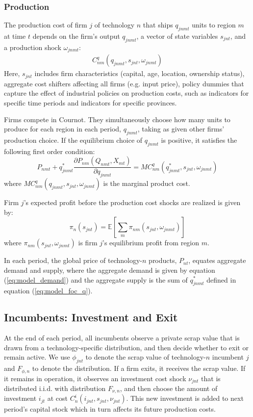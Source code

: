 \documentclass[12pt]{article}
\begin{document}
\subsubsection*{Production}
The production cost of firm $j$ of technology $n$ that ships $q_{jnmt}$ units to region $m$ at time $t$ depends on the firm's output $q_{jnmt}$, a vector of state variables $s_{jnt}$, and a production shock $\omega_{jnmt}$:
    \begin{align}
         C^q_{nm}(q_{jnmt},s_{jnt},\omega_{jnmt}) \nonumber
    \end{align}
Here, $s_{jnt}$ includes firm characteristics (capital, age, location, ownership status), aggregate cost shifters affecting all firms (e.g. input price), policy dummies that capture the effect of industrial policies on production costs, such as indicators for specific time periods and indicators for specific provinces.

Firms compete in Cournot. They simultaneously choose how many units to produce for each region in each period, $q_{jnmt}$, taking as given other firms' production choice. If the equilibrium choice of $q_{jnmt}$ is positive, it satisfies the following first order condition:
 \begin{equation}
    P_{nmt}+q_{jnmt}^*\frac{\partial P_{nm}(Q_{nmt},X_{mt})}{\partial q_{jnmt}}=MC^q_{nm} (q_{jnmt}^*,s_{jnt},\omega_{jnmt}) \label{eq:model_foc_q}
\end{equation}   
where $MC^q_{nm} (q_{jnmt},s_{jnt},\omega_{jnmt})$ is the marginal product cost. 

Firm $j$'s expected profit before the production cost shocks are realized is given by:
\[
\pi_n(s_{jnt}) = \mathbb{E} [\sum_m \pi_{nm}(s_{jnt},\omega_{jnmt})]
\]
where $\pi_{nm}(s_{jnt},\omega_{jnmt})$ is firm $j$'s equilibrium profit from region $m$.

In each period, the global price of technology-$n$ products, $P_{nt}$, equates aggregate demand and supply, where the aggregate demand is given by equation (\ref{eq:model_demand}) and the aggregate supply is the sum of $q_{jnmt}^*$ defined in equation (\ref{eq:model_foc_q}).


\subsection{Incumbents: Investment and Exit}
At the end of each period, all incumbents observe a private scrap value that is drawn from a technology-specific distribution, and then decide whether to exit or remain active. We use $\phi_{jnt}$ to denote the scrap value of technology-$n$ incumbent $j$ and $F_{\phi,n}$ to denote the distribution. If a firm exits, it receives the scrap value. If it remains in operation, it observes an investment cost shock $\nu_{jnt}$ that is distributed i.i.d. with distribution $F_{\nu,n}$, and then choose the amount of investment $i_{jt}$ at cost $C_n^i(i_{jnt},s_{jnt},\nu_{jnt})$. This new investment is added to next period's capital stock which in turn affects its future production costs.
\end{document}
